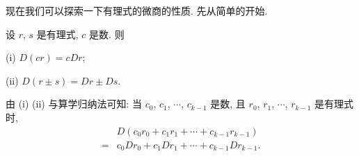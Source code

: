 现在我们可以探索一下有理式的微商的性质. 先从简单的开始.

\begin{proposition}
    设 $r$, $s$ 是有理式, $c$ 是数. 则

    (i) $D(cr) = c Dr$;

    (ii) $D(r \pm s) = Dr \pm Ds$.

    由 (i) (ii) 与算学归纳法可知: 当 $c_0$, $c_1$, $\cdots$, $c_{k-1}$ 是数, 且 $r_0$, $r_1$, $\cdots$, $r_{k-1}$ 是有理式时,
    \begin{align*}
             & D \left( c_0 r_0 + c_1 r_1 + \cdots + c_{k-1} r_{k-1} \right) \\
        = {} & c_0 Dr_0 + c_1 Dr_1 + \cdots + c_{k-1} Dr_{k-1}.
    \end{align*}
\end{proposition}

